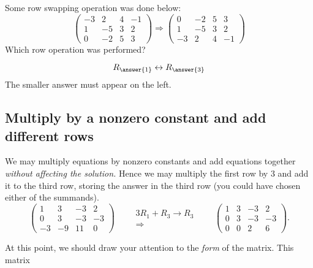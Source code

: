 \documentclass{ximera}
\begin{document}
\begin{question}
  Some row swapping operation was done below:
  \[
  \begin{pmatrix}
-3 & 2 & 4 & -1 \\
1 & -5 & 3 & 2 \\
0 & -2 & 5 & 3
  \end{pmatrix}
  \Rightarrow
  \begin{pmatrix}
0 & -2 & 5 & 3 \\
1 & -5 & 3 & 2 \\
-3 & 2 & 4 & -1
\end{pmatrix}
  \]
  Which row operation was performed?
  \begin{prompt}
    \[
    R_{\answer{1}} \leftrightarrow R_{\answer{3}}
    \]
    The smaller answer must appear on the left.
  \end{prompt}
\end{question}


\subsection{Multiply by a nonzero constant and add different rows}
We may multiply equations by nonzero constants and add equations together
\emph{without affecting the solution.} Hence we may multiply the first
row by $3$ and add it to the third row, storing the answer in the
third row (you could have chosen either of the summands).
\[
\left(\begin{array}{ccc|c}
  1 &   3 & -3 & 2  \\
  0 &   3 & -3 & -3 \\
  -3& -9  & 11 & 0
\end{array}\right)
\qquad
\begin{array}{c}
  \scriptstyle 3R_1+R_3\rightarrow R_3\\\Longrightarrow
\end{array}
\qquad
\left(\begin{array}{ccc|c}
  1 &   3 & -3 & 2  \\
  0 &   3 & -3 & -3 \\
  0& 0  & 2 & 6
\end{array}\right).
\]

\begin{question}
\end{question}



At this point, we should draw your attention to the \emph{form} of the matrix. This matrix
\end{document}
